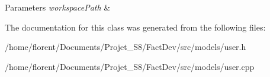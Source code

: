 \begin{DoxyParams}{Parameters}
{\em workspace\-Path} & \\
\hline
\end{DoxyParams}


The documentation for this class was generated from the following files\-:\begin{DoxyCompactItemize}
\item 
/home/florent/\-Documents/\-Projet\-\_\-\-S8/\-Fact\-Dev/src/models/user.\-h\item 
/home/florent/\-Documents/\-Projet\-\_\-\-S8/\-Fact\-Dev/src/models/user.\-cpp\end{DoxyCompactItemize}

